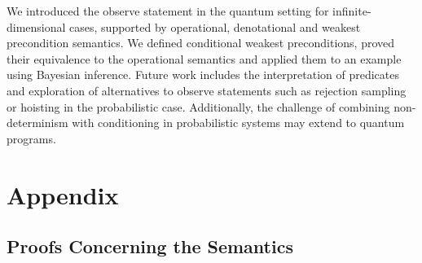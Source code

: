 \documentclass[a4paper,UKenglish,cleveref, autoref, thm-restate]{lipics-v2021}
\begin{document}
We introduced the observe statement in the quantum setting for infinite-dimensional cases, supported by operational, denotational and weakest precondition semantics. We defined conditional weakest preconditions, proved their equivalence to the operational semantics and applied them to an example using Bayesian inference. Future work includes the interpretation of predicates and exploration of alternatives to observe statements such as rejection sampling or hoisting in the probabilistic case. Additionally, the challenge of combining non-determinism with conditioning in probabilistic systems \cite{conditioningProb} may extend to quantum programs. 






\appendix
\section{Appendix}
\label{sec:app}
\subsection{Proofs Concerning the Semantics}
\label{app:semantics}
\end{document}
